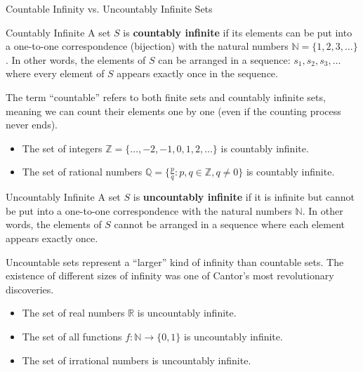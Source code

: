 \begin{keyconceptboxbreak}{Countable Infinity vs. Uncountably Infinite Sets}

    \begin{definitionboxbreak}{Countably Infinite}
    A set $S$ is \textbf{countably infinite} if its elements can be put into a one-to-one correspondence (bijection) with the natural numbers $\mathbb{N} = \{1, 2, 3, \ldots\}$. In other words, the elements of $S$ can be arranged in a sequence: $s_1, s_2, s_3, \ldots$ where every element of $S$ appears exactly once in the sequence.
    \end{definitionboxbreak}
    
    The term ``countable'' refers to both finite sets and countably infinite sets, meaning we can count their elements one by one (even if the counting process never ends).

    \begin{itemize}
        \item The set of integers $\mathbb{Z} = \{\ldots, -2, -1, 0, 1, 2, \ldots\}$ is countably infinite.
        \item The set of rational numbers $\mathbb{Q} = \{\frac{p}{q} : p, q \in \mathbb{Z}, q \neq 0\}$ is countably infinite.
    \end{itemize}

    \begin{definitionboxbreak}{Uncountably Infinite}
    A set $S$ is \textbf{uncountably infinite} if it is infinite but cannot be put into a one-to-one correspondence with the natural numbers $\mathbb{N}$. In other words, the elements of $S$ cannot be arranged in a sequence where each element appears exactly once.
    \end{definitionboxbreak}
    
    Uncountable sets represent a ``larger'' kind of infinity than countable sets. The existence of different sizes of infinity was one of Cantor's most revolutionary discoveries.

    \begin{itemize}
        \item The set of real numbers $\mathbb{R}$ is uncountably infinite.
        \item The set of all functions $f: \mathbb{N} \rightarrow \{0,1\}$ is uncountably infinite.
        \item The set of irrational numbers is uncountably infinite.
    \end{itemize}
\end{keyconceptboxbreak}

